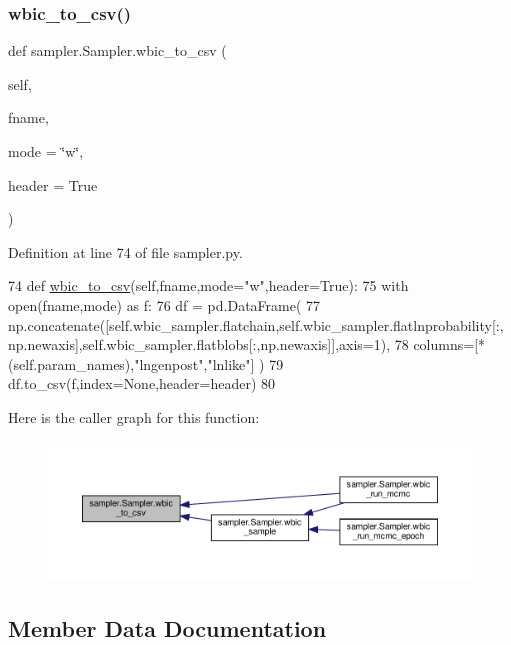 \subsubsection{\texorpdfstring{wbic\+\_\+to\+\_\+csv()}{wbic\_to\_csv()}}
{\footnotesize\ttfamily def sampler.\+Sampler.\+wbic\+\_\+to\+\_\+csv (\begin{DoxyParamCaption}\item[{}]{self,  }\item[{}]{fname,  }\item[{}]{mode = {\ttfamily \char`\"{}w\char`\"{}},  }\item[{}]{header = {\ttfamily True} }\end{DoxyParamCaption})}



Definition at line 74 of file sampler.\+py.


\begin{DoxyCode}
74     \textcolor{keyword}{def }\hyperlink{classsampler_1_1Sampler_a6ade3671106e25577cd51ea1a055b680}{wbic\_to\_csv}(self,fname,mode="w",header=True):
75         with open(fname,mode) \textcolor{keyword}{as} f:
76             df = pd.DataFrame(
77                 np.concatenate([self.wbic\_sampler.flatchain,self.wbic\_sampler.flatlnprobability[:,
      np.newaxis],self.wbic\_sampler.flatblobs[:,np.newaxis]],axis=1),
78                 columns=[*(self.param\_names),\textcolor{stringliteral}{"lngenpost"},\textcolor{stringliteral}{"lnlike"}] )
79             df.to\_csv(f,index=\textcolor{keywordtype}{None},header=header)
80     
\end{DoxyCode}
Here is the caller graph for this function\+:\nopagebreak
\begin{figure}[H]
\begin{center}
\leavevmode
\includegraphics[width=350pt]{d3/d8a/classsampler_1_1Sampler_a6ade3671106e25577cd51ea1a055b680_icgraph}
\end{center}
\end{figure}


\subsection{Member Data Documentation}
\mbox{\label{classsampler_1_1Sampler_a6f7037a873847e97098dc065a329d0a3}} 

